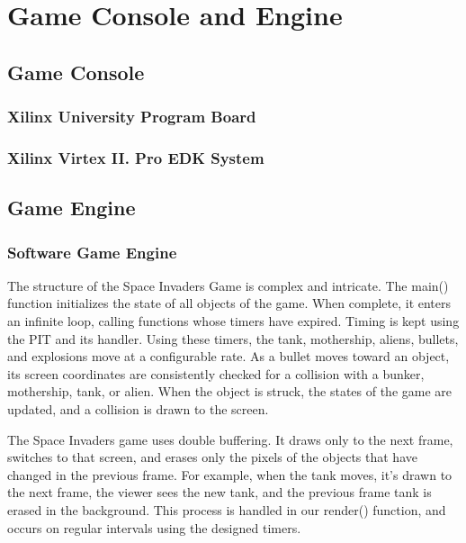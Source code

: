 \documentclass[11pt,letter,oneside]{report}
\begin{document}
\chapter{Game Console and Engine}

\section{Game Console}
\subsection{Xilinx University Program Board}
\subsection{Xilinx Virtex II. Pro EDK System}

\section{Game Engine }

\subsection{Software Game Engine}
The structure of the Space Invaders Game is complex and intricate. The main() function initializes the state of all objects of the game. When complete, it enters an infinite loop, calling functions whose timers have expired. Timing is kept using the PIT and its handler. Using these timers, the tank, mothership, aliens, bullets, and explosions move at a configurable rate. As a bullet moves toward an object, its screen coordinates are consistently checked for a collision with a bunker, mothership, tank, or alien. When the object is struck, the states of the game are updated, and a collision is drawn to the screen.

The Space Invaders game uses double buffering. It draws only to the next frame, switches to that screen, and erases only the pixels of the objects that have changed in the previous frame. For example, when the tank moves, it's drawn to the next frame, the viewer sees the new tank, and the previous frame tank is erased in the background. This process is handled in our render() function, and occurs on regular intervals using the designed timers.
\end{document}
